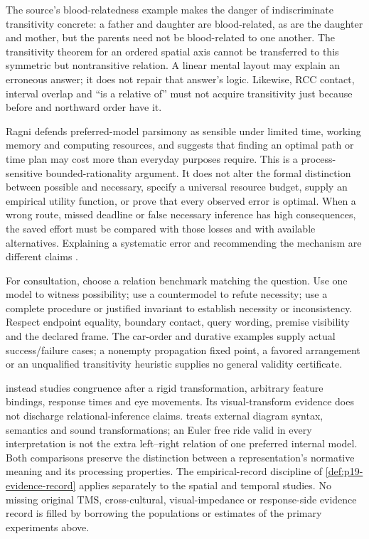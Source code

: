 The source's blood-relatedness example makes the danger of indiscriminate
transitivity concrete: a father and daughter are blood-related, as are the
daughter and mother, but the parents need not be blood-related to one
another. The transitivity theorem for an ordered spatial axis cannot be
transferred to this symmetric but nontransitive relation. A linear mental
layout may explain an erroneous answer; it does not repair that answer's
logic. Likewise, RCC contact, interval overlap and ``is a relative of''
must not acquire transitivity just because before and northward order have it.

Ragni defends preferred-model parsimony as sensible under limited time,
working memory and computing resources, and suggests that finding an optimal
path or time plan may cost more than everyday purposes require. This is
a process-sensitive bounded-rationality argument. It does not alter the
formal distinction between possible and necessary, specify a universal
resource budget, supply an empirical utility function, or prove that every
observed error is optimal. When a wrong route, missed deadline or false
necessary inference has high consequences, the saved effort must be compared
with those losses and with available alternatives. Explaining a systematic
error and recommending the mechanism are different claims
\cite[secs.~6.3--7, pp.~731--732]{Ragni2021SpatialTemporal}.

For consultation, choose a relation benchmark matching the question.
Use one model to witness possibility; use a countermodel to refute necessity;
use a complete procedure or justified invariant to establish necessity or
inconsistency. Respect endpoint equality, boundary contact, query wording,
premise visibility and the declared frame. The car-order and durative
examples supply actual success/failure cases; a nonempty propagation fixed
point, a favored arrangement or an unqualified transitivity heuristic
supplies no general validity certificate.

 instead studies congruence after a rigid
transformation, arbitrary feature bindings, response times and eye movements.
Its visual-transform evidence does not discharge relational-inference
claims.  treats external diagram syntax,
semantics and sound transformations; an Euler free ride valid in every
interpretation is not the extra left--right relation of one preferred
internal model. Both comparisons preserve the distinction between a
representation's normative meaning and its processing properties. The
empirical-record discipline of \cref{def:p19-evidence-record} applies
separately to the spatial and temporal studies. No missing original TMS,
cross-cultural, visual-impedance or response-side evidence record is filled
by borrowing the populations or estimates of the primary experiments above.
